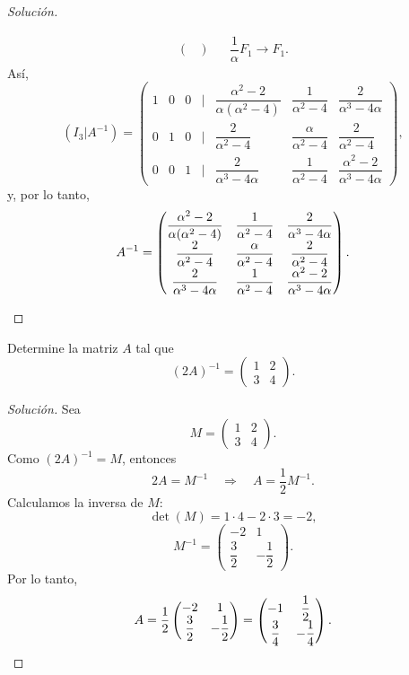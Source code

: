 \documentclass[a4,11pt]{aleph-notas}
\begin{document}
\begin{proof}[Solución]
\begin{enumerate}
\begin{align*}
\begin{pmatrix}
            \end{pmatrix} && \dfrac{1}{\alpha} F_1 \rightarrow F_1.
    \end{align*}
    Así, 
    \[
        (I_3|A^{-1}) = \begin{pmatrix}
                1 & 0 & 0 & | & \dfrac{\alpha^2-2}{\alpha(\alpha^2-4)} & \dfrac{1}{\alpha^2-4} & \dfrac{2}{\alpha^3-4\alpha}\\
            0 & 1 & 0 & | & \dfrac{2}{\alpha^2-4} & \dfrac{\alpha}{\alpha^2-4} & \dfrac{2}{\alpha^2-4}\\
                0 & 0 & 1 & | & \dfrac{2}{\alpha^3-4\alpha} & \dfrac{1}{\alpha^2-4} & \dfrac{\alpha^2-2}{\alpha^3-4\alpha}
            \end{pmatrix},
    \]
    y, por lo tanto, 
    \[
        A^{-1} = \begin{pmatrix}
                \dfrac{\alpha^2-2}{\alpha(\alpha^2-4)} & \dfrac{1}{\alpha^2-4} & \dfrac{2}{\alpha^3-4\alpha}\\
            \dfrac{2}{\alpha^2-4} & \dfrac{\alpha}{\alpha^2-4} & \dfrac{2}{\alpha^2-4}\\
                \dfrac{2}{\alpha^3-4\alpha} & \dfrac{1}{\alpha^2-4} & \dfrac{\alpha^2-2}{\alpha^3-4\alpha}
            \end{pmatrix}. \qedhere
    \]
    \end{enumerate}
\end{proof}


\begin{ejer}
    Determine la matriz $A$ tal que
    \[
        (2A)^{-1}=\begin{pmatrix}
            1 & 2\\
            3 & 4
        \end{pmatrix}.
    \]
\end{ejer}

\begin{proof}[Solución]\hspace{0pt}
    Sea
    \[
        M=\begin{pmatrix}
            1 & 2\\
            3 & 4
        \end{pmatrix}.
    \]
    Como $(2A)^{-1}=M$, entonces
    \[
        2A=M^{-1}
        \quad\Longrightarrow\quad
        A=\frac{1}{2}M^{-1}.
    \]
    Calculamos la inversa de $M$:
    \[
        \det(M)=1\cdot4-2\cdot3=-2,
    \]
    \[
        M^{-1}=\begin{pmatrix}
            -2 & 1\\
            \dfrac{3}{2} & -\dfrac{1}{2}
        \end{pmatrix}.
    \]
    Por lo tanto,
    \[
        A=\frac{1}{2}\begin{pmatrix}
            -2 & 1\\
            \dfrac{3}{2} & -\dfrac{1}{2}
        \end{pmatrix}
        =\begin{pmatrix}
            -1 & \dfrac{1}{2}\\
            \dfrac{3}{4} & -\dfrac{1}{4}
        \end{pmatrix}.\qedhere
    \]
\end{proof}
\end{document}
